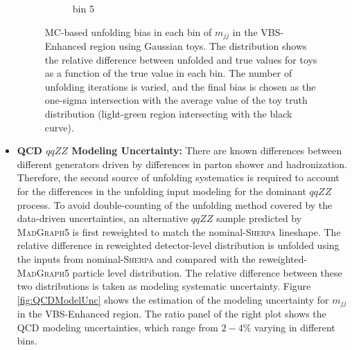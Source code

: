 \begin{itemize}
{\begin{figure}[htb]
\begin{subfigure}{.48\textwidth}
            \caption{bin 5 }
        \end{subfigure}
        \caption{ MC-based unfolding bias in each bin of $m_{jj}$ in the VBS-Enhanced region using Gaussian toys. The distribution shows the relative difference between unfolded and true values for toys as a function of the true value in each bin. The number of unfolding iterations is varied, and the final bias is chosen as the one-sigma intersection with the average value of the toy truth distribution (light-green region intersecting with the black curve). \label{fig:UnfoldingBias_mjj_VBSEnhanced}}
    \end{figure}

    }

    \item{\textbf{QCD $qqZZ$ Modeling Uncertainty:} There are known differences between different generators driven by differences in parton shower and hadronization. Therefore, the second source of unfolding systematics is required to account for the differences in the unfolding input modeling for the dominant $qqZZ$ process. To avoid double-counting of the unfolding method covered by the data-driven uncertainties, an alternative $qqZZ$ sample predicted by \textsc{MadGraph5} is first reweighted to match the nominal-\textsc{Sherpa} lineshape. The relative difference in reweighted detector-level distribution is unfolded using the inputs from nominal-\textsc{Sherpa} and compared with the reweighted-\textsc{MadGraph5} particle level distribution. The relative difference between these two distributions is taken as modeling systematic uncertainty. Figure \ref{fig:QCDModelUnc} shows the estimation of the modeling uncertainty for $m_{jj}$ in the VBS-Enhanced region. The ratio panel of the right plot shows the QCD modeling uncertainties, which range from $2-4\%$ varying in different bins.
    
}
\end{itemize}
